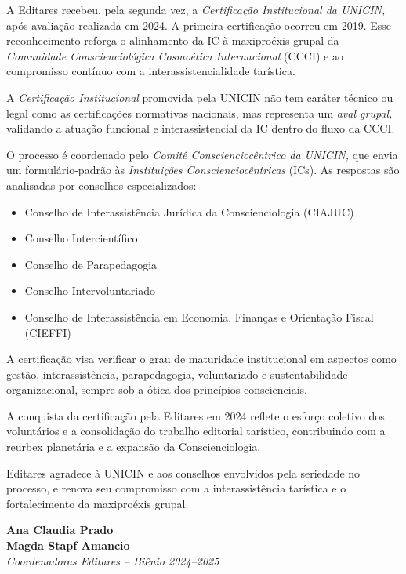 \documentclass{gescons}
\begin{document}

A Editares recebeu, pela segunda vez, a \emph{Certificação Institucional
da UNICIN,} após avaliação realizada em 2024. A primeira certificação
ocorreu em 2019. Esse reconhecimento reforça o alinhamento da IC à
maxiproéxis grupal da \emph{Comunidade Conscienciológica Cosmoética
Internacional} (CCCI) e ao compromisso contínuo com a
interassistencialidade tarística.

A \emph{Certificação Institucional} promovida pela UNICIN não tem
caráter técnico ou legal como as certificações normativas nacionais, mas
representa um \emph{aval grupal,} validando a atuação funcional e
interassistencial da IC dentro do fluxo da CCCI.

O processo é coordenado pelo \emph{Comitê Conscienciocêntrico da
UNICIN,} que envia um formulário-padrão às \emph{Instituições
Conscienciocêntricas} (ICs). As respostas são analisadas por conselhos
especializados:

\begin{itemize}
\item
  Conselho de Interassistência Jurídica da Conscienciologia (CIAJUC)
\item
  Conselho Intercientífico
\item
  Conselho de Parapedagogia
\item
  Conselho Intervoluntariado
\item
  Conselho de Interassistência em Economia, Finanças e Orientação Fiscal
  (CIEFFI)
\end{itemize}

A certificação visa verificar o grau de maturidade institucional em
aspectos como gestão, interassistência, parapedagogia, voluntariado e
sustentabilidade organizacional, sempre sob a ótica dos princípios
conscienciais.

A conquista da certificação pela Editares em 2024 reflete o esforço
coletivo dos voluntários e a consolidação do trabalho editorial
tarístico, contribuindo com a reurbex planetária e a expansão da
Conscienciologia.

Editares agradece à UNICIN e aos conselhos envolvidos pela seriedade no
processo, e renova seu compromisso com a interassistência tarística e o
fortalecimento da maxiproéxis grupal.

\textbf{Ana Claudia Prado}\\
\textbf{Magda Stapf Amancio\\
}\emph{Coordenadoras Editares -- Biênio 2024--2025}




        
\end{document}
